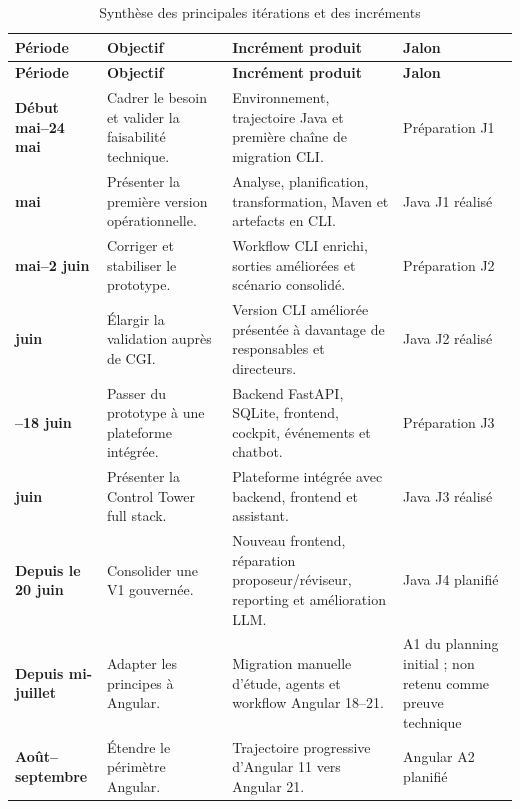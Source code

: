 \scriptsize
\begin{longtable}{|>{\bfseries\RaggedRight\arraybackslash}p{2.8cm}|>{\RaggedRight\arraybackslash}p{4.0cm}|>{\RaggedRight\arraybackslash}p{5.2cm}|>{\RaggedRight\arraybackslash}p{2.8cm}|}
    \caption{Synthèse des principales itérations et des incréments}\label{tab:iterations-increments-ch1}\\
    \hline
    \rowcolor{cgilight!95}
    \textbf{Période} & \textbf{Objectif} & \textbf{Incrément produit} & \textbf{Jalon} \\
    \hline
    \endfirsthead
    \hline
    \rowcolor{cgilight!95}
    \textbf{Période} & \textbf{Objectif} & \textbf{Incrément produit} & \textbf{Jalon} \\
    \hline
    \endhead
    Début mai--24 mai & Cadrer le besoin et valider la faisabilité technique. & Environnement, trajectoire Java et première chaîne de migration CLI. & Préparation J1 \\
    \hline
    25 mai & Présenter la première version opérationnelle. & Analyse, planification, transformation, Maven et artefacts en CLI. & Java J1 réalisé \\
    \hline
    26 mai--2 juin & Corriger et stabiliser le prototype. & Workflow CLI enrichi, sorties améliorées et scénario consolidé. & Préparation J2 \\
    \hline
    3 juin & Élargir la validation auprès de CGI. & Version CLI améliorée présentée à davantage de responsables et directeurs. & Java J2 réalisé \\
    \hline
    4--18 juin & Passer du prototype à une plateforme intégrée. & Backend FastAPI, SQLite, frontend, cockpit, événements et chatbot. & Préparation J3 \\
    \hline
    19 juin & Présenter la Control Tower full stack. & Plateforme intégrée avec backend, frontend et assistant. & Java J3 réalisé \\
    \hline
    Depuis le 20 juin & Consolider une V1 gouvernée. & Nouveau frontend, réparation proposeur/réviseur, reporting et amélioration LLM. & Java J4 planifié \\
    \hline
    Depuis mi-juillet & Adapter les principes à Angular. & Migration manuelle d'étude, agents et workflow Angular 18--21. & A1 du planning initial ; non retenu comme preuve technique \\
    \hline
    Août--septembre & Étendre le périmètre Angular. & Trajectoire progressive d'Angular 11 vers Angular 21. & Angular A2 planifié \\
    \hline
\end{longtable}
\normalsize

